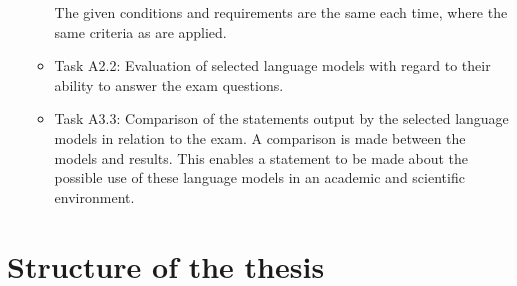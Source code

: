 \begin{itemize}
\begin{itemize}
          The given conditions and requirements are the same each time, where the same criteria as \citet{Paul_Keller} are applied.
          \item Task A2.2: Evaluation of selected language models with regard to their ability to answer the exam questions.
          \item Task A3.3:
          Comparison of the statements output by the selected language models in relation to the exam.
          A comparison is made between the models and \citet{Paul_Keller} results.
          This enables a statement to be made about the possible use of these language models in an academic and scientific environment.
        \end{itemize}
\end{itemize}



\section{Structure of the thesis}
